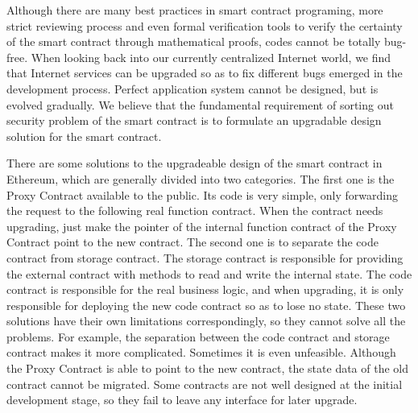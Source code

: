 Although there are many best practices in smart contract programing, more strict reviewing process and even formal verification tools to verify the certainty of the smart contract through mathematical proofs, codes cannot be totally bug-free. When looking back into our currently centralized Internet world, we find that Internet services can be upgraded so as to fix different bugs emerged in the development process. Perfect application system cannot be designed, but is evolved gradually. We believe that the fundamental requirement of sorting out security problem of the smart contract is to formulate an upgradable design solution for the smart contract.


There are some solutions to the upgradeable design of the smart contract in Ethereum, which are generally divided into two categories. The first one is the Proxy Contract available to the public. Its code is very simple, only forwarding the request to the following real function contract. When the contract needs upgrading, just make the pointer of the internal function contract of the Proxy Contract point to the new contract. The second one is to separate the code contract from storage contract. The storage contract is responsible for providing the external contract with methods to read and write the internal state. The code contract is responsible for the real business logic, and when upgrading, it is only responsible for deploying the new code contract so as to lose no state. These two solutions have their own limitations correspondingly, so they cannot solve all the problems. For example, the separation between the code contract and storage contract makes it more complicated. Sometimes it is even unfeasible. Although the Proxy Contract is able to point to the new contract, the state data of the old contract cannot be migrated. Some contracts are not well designed at the initial development stage, so they fail to leave any interface for later upgrade.


